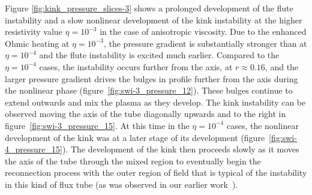 \documentclass[fleqn,usenatbib]{mnras}
\begin{document}
Figure
  \ref{fig:kink_pressure_slices-3} shows a prolonged 
development of the flute instability and a slow
nonlinear development of the kink instability at the higher
  resistivity value $\eta=10^{-3}$ in the case of anisotropic viscosity. Due to the enhanced Ohmic heating 
at $\eta=10^{-3}$, the pressure gradient is substantially stronger
than at $\eta=10^{-4}$ and the flute instability is
excited much earlier. Compared to the $\eta=10^{-4}$ cases, the
instability occurs further from the axis, at $r\approx0.16$, and the
larger pressure gradient drives the bulges in profile further
from the axis during the nonlinear phase
(figure~\ref{fig:swi-3_pressure_12}). These bulges continue to extend
outwards and mix the plasma as they develop. The kink instability can
be observed moving the axis of the tube diagonally upwards and to the
right in figure~\ref{fig:swi-3_pressure_15}. At this time in the
$\eta=10^{-4}$ cases, the nonlinear development of the kink was
at a later stage of its development (figure~\ref{fig:swi-4_pressure_15}). The development of
the kink then proceeds slowly as it moves the axis of the tube through
the mixed region to eventually begin the reconnection process with the
outer region of field that is typical of the instability in this kind
of flux tube (as was observed in
our earlier work~\citep{quinnEffectAnisotropicViscosity2020}). 
\end{document}
